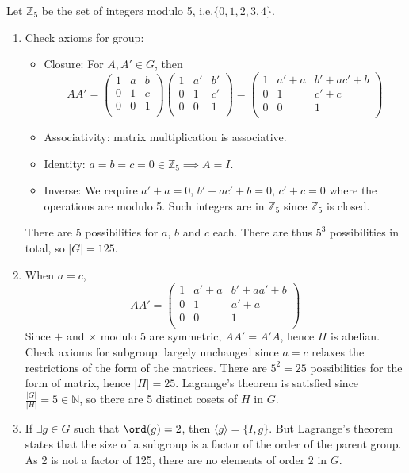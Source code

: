 \documentclass[a4paper]{article}
\begin{document}
\begin{ans}\leavevmode
Let $\mathbb{Z}_5$ be the set of integers modulo 5, i.e.$\{0,1,2,3,4\}$.
\begin{enumerate}[label=(\alph*)]
\item Check axioms for group:
\begin{itemize}
    \item Closure: For $A,A'\in G$, then 
    $$AA'=\begin{pmatrix}1&a&b\\0&1&c\\0&0&1\\\end{pmatrix}\begin{pmatrix}1&a'&b'\\0&1&c'\\0&0&1\\\end{pmatrix}=\begin{pmatrix}1&a'+a&b'+ac'+b\\0&1&c'+c\\0&0&1\\\end{pmatrix}$$
    \item Associativity: matrix multiplication is associative.
    \item Identity: $a=b=c=0\in\mathbb{Z}_5\implies A=I$.
    \item Inverse: We require $a'+a=0$, $b'+ac'+b=0$, $c'+c=0$ where the operations are modulo 5. Such integers are in $\mathbb{Z}_5$ since $\mathbb{Z}_5$ is closed.
\end{itemize}
There are 5 possibilities for $a$, $b$ and $c$ each. There are thus $5^3$ possibilities in total, so $|G|=125$.
\item When $a=c$, 
$$AA'=\begin{pmatrix}1&a'+a&b'+aa'+b\\0&1&a'+a\\0&0&1\\\end{pmatrix}$$
Since $+$ and $\times$ modulo 5 are symmetric, $AA'=A'A$, hence $H$ is abelian. Check axioms for subgroup: largely unchanged since $a=c$ relaxes the restrictions of the form of the matrices. There are $5^2=25$ possibilities for the form of matrix, hence $|H|=25$. Lagrange's theorem is satisfied since $\frac{|G|}{|H|}=5\in\mathbb{N}$, so there are 5 distinct cosets of $H$ in $G$.
\item If $\exists g\in G$ such that $\ord(g)=2$, then $\langle g\rangle=\{I,g\}$. But Lagrange's theorem states that the size of a subgroup is a factor of the order of the parent group. As 2 is not a factor of 125, there are no elements of order 2 in $G$.\\[5pt]

\end{enumerate}
\end{ans}
\end{document}
